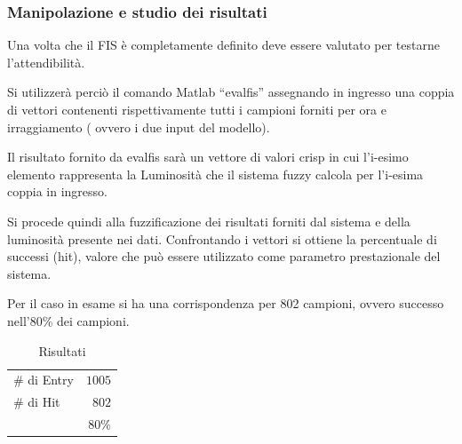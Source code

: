 \subsubsection{Manipolazione e studio dei risultati}
Una volta che il FIS è completamente definito deve essere valutato per testarne l'attendibilità.

Si utilizzerà perciò il comando Matlab “evalfis” assegnando in ingresso una coppia di vettori contenenti rispettivamente tutti i campioni forniti per ora e irraggiamento ( ovvero i due input del modello).

Il risultato fornito da evalfis sarà un vettore di valori crisp in cui l'i-esimo elemento rappresenta la Luminosità che il sistema fuzzy calcola per l'i-esima coppia in ingresso.

Si procede quindi alla fuzzificazione dei risultati forniti dal sistema e della luminosità presente nei dati. Confrontando i vettori si ottiene la percentuale di successi (hit), valore che può essere utilizzato come parametro prestazionale del sistema.

Per il caso in esame si ha una corrispondenza per 802 campioni, ovvero successo nell'80\% dei campioni.
\begin{table}
  \caption{Risultati}
  \centering
	\begin{tabular}{lr}
		\toprule
      \# di Entry & $1005$ \\
			\# di Hit   & $802$ \\
		\midrule
			& $80\%$ \\
		\bottomrule
	\end{tabular}
\end{table}


